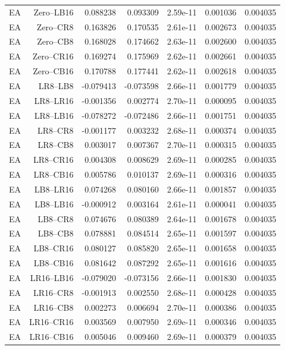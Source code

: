 {\begin{longtable}{lrrrrrr}
EA & Zero--LB16 & 0.088238 & 0.093309 & 2.59e-11 & 0.001036 & 0.004035 \\
EA & Zero--CR8 & 0.163826 & 0.170535 & 2.61e-11 & 0.002673 & 0.004035 \\
EA & Zero--CB8 & 0.168028 & 0.174662 & 2.63e-11 & 0.002600 & 0.004035 \\
EA & Zero--CR16 & 0.169274 & 0.175969 & 2.62e-11 & 0.002661 & 0.004035 \\
EA & Zero--CB16 & 0.170788 & 0.177441 & 2.62e-11 & 0.002618 & 0.004035 \\
EA & LR8--LB8 & -0.079413 & -0.073598 & 2.66e-11 & 0.001779 & 0.004035 \\
EA & LR8--LR16 & -0.001356 & 0.002774 & 2.70e-11 & 0.000095 & 0.004035 \\
EA & LR8--LB16 & -0.078272 & -0.072486 & 2.66e-11 & 0.001751 & 0.004035 \\
EA & LR8--CR8 & -0.001177 & 0.003232 & 2.68e-11 & 0.000374 & 0.004035 \\
EA & LR8--CB8 & 0.003017 & 0.007367 & 2.70e-11 & 0.000315 & 0.004035 \\
EA & LR8--CR16 & 0.004308 & 0.008629 & 2.69e-11 & 0.000285 & 0.004035 \\
EA & LR8--CB16 & 0.005786 & 0.010137 & 2.69e-11 & 0.000316 & 0.004035 \\
EA & LB8--LR16 & 0.074268 & 0.080160 & 2.66e-11 & 0.001857 & 0.004035 \\
EA & LB8--LB16 & -0.000912 & 0.003164 & 2.61e-11 & 0.000041 & 0.004035 \\
EA & LB8--CR8 & 0.074676 & 0.080389 & 2.64e-11 & 0.001678 & 0.004035 \\
EA & LB8--CB8 & 0.078881 & 0.084514 & 2.65e-11 & 0.001597 & 0.004035 \\
EA & LB8--CR16 & 0.080127 & 0.085820 & 2.65e-11 & 0.001658 & 0.004035 \\
EA & LB8--CB16 & 0.081642 & 0.087292 & 2.65e-11 & 0.001616 & 0.004035 \\
EA & LR16--LB16 & -0.079020 & -0.073156 & 2.66e-11 & 0.001830 & 0.004035 \\
EA & LR16--CR8 & -0.001913 & 0.002550 & 2.68e-11 & 0.000428 & 0.004035 \\
EA & LR16--CB8 & 0.002273 & 0.006694 & 2.70e-11 & 0.000386 & 0.004035 \\
EA & LR16--CR16 & 0.003569 & 0.007950 & 2.69e-11 & 0.000346 & 0.004035 \\
EA & LR16--CB16 & 0.005046 & 0.009460 & 2.69e-11 & 0.000379 & 0.004035 \\

\end{longtable}}
